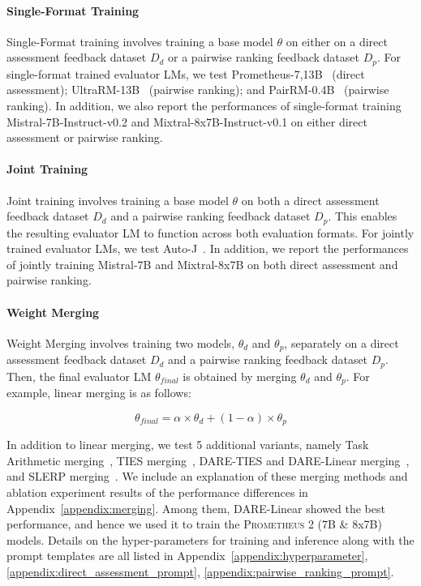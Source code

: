 \documentclass[11pt]{article}
\begin{document}
\paragraph{Single-Format Training} Single-Format training involves training a base model $\theta$ on either on a direct assessment feedback dataset ${D}_{d}$ or a pairwise ranking feedback dataset ${D}_{p}$. For single-format trained evaluator LMs, we test Prometheus-{7,13}B~\citep{kim2023prometheus} (direct assessment); UltraRM-13B~\citep{cui2023ultrafeedback} (pairwise ranking); and PairRM-0.4B~\citep{jiang2023llm} (pairwise ranking). In addition, we also report the performances of single-format training Mistral-7B-Instruct-v0.2 and Mixtral-8x7B-Instruct-v0.1 on either direct assessment or pairwise ranking.

\paragraph{Joint Training} Joint training involves training a base model $\theta$ on both a direct assessment feedback dataset ${D}_{d}$ and a pairwise ranking feedback dataset ${D}_{p}$. This enables the resulting evaluator LM to function across both evaluation formats. For jointly trained evaluator LMs, we test Auto-J~\citep{li2023generative}. In addition, we report the performances of jointly training Mistral-7B and Mixtral-8x7B on both direct assessment and pairwise ranking.


\paragraph{Weight Merging} Weight Merging involves training two models, ${\theta}_{d}$ and ${\theta}_{p}$, separately on a direct assessment feedback dataset ${D}_{d}$ and a pairwise ranking feedback dataset ${D}_{p}$. Then, the final evaluator LM ${\theta}_{final}$ is obtained by merging ${\theta}_{d}$ and ${\theta}_{p}$. For example, linear merging is as follows:


\begin{equation}
    {\theta}_{final} = \alpha \times {\theta}_{d} + (1 - \alpha) \times {\theta}_{p}
\end{equation}


In addition to linear merging, we test 5 additional variants, namely Task Arithmetic merging~\citep{ilharco2022editing}, TIES merging~\citep{yadav2024ties}, DARE-TIES and DARE-Linear merging~\citep{yu2023language}, and SLERP merging~\citep{goddard2024arcee}. We include an explanation of these merging methods and ablation experiment results of the performance differences in Appendix~\ref{appendix:merging}. Among them, DARE-Linear showed the best performance, and hence we used it to train the \textsc{Prometheus 2} (7B \& 8x7B) models. Details on the hyper-parameters for training and inference along with the prompt templates are all listed in Appendix~\ref{appendix:hyperparameter}, \ref{appendix:direct_assessment_prompt}, \ref{appendix:pairwise_ranking_prompt}.
\end{document}
